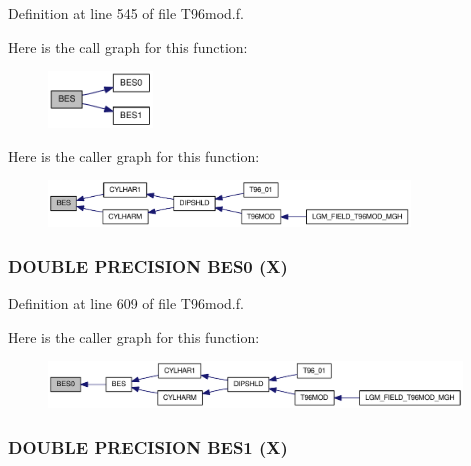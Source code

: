 Definition at line 545 of file T96mod.f.

Here is the call graph for this function:\nopagebreak
\begin{figure}[H]
\begin{center}
\leavevmode
\includegraphics[width=79pt]{_t96mod_8f_273ee53e86263995858fc8c0a702433a_cgraph}
\end{center}
\end{figure}


Here is the caller graph for this function:\nopagebreak
\begin{figure}[H]
\begin{center}
\leavevmode
\includegraphics[width=272pt]{_t96mod_8f_273ee53e86263995858fc8c0a702433a_icgraph}
\end{center}
\end{figure}
\hypertarget{_t96mod_8f_bc4ab00dda905b70971f5b3dae102841}{
\subsubsection[{BES0}]{\setlength{\rightskip}{0pt plus 5cm}DOUBLE PRECISION BES0 (X)}}
\label{_t96mod_8f_bc4ab00dda905b70971f5b3dae102841}




Definition at line 609 of file T96mod.f.

Here is the caller graph for this function:\nopagebreak
\begin{figure}[H]
\begin{center}
\leavevmode
\includegraphics[width=311pt]{_t96mod_8f_bc4ab00dda905b70971f5b3dae102841_icgraph}
\end{center}
\end{figure}
\hypertarget{_t96mod_8f_5dd1f9e8738676c1ded360e252f7ef48}{
\subsubsection[{BES1}]{\setlength{\rightskip}{0pt plus 5cm}DOUBLE PRECISION BES1 (X)}}
\label{_t96mod_8f_5dd1f9e8738676c1ded360e252f7ef48}




